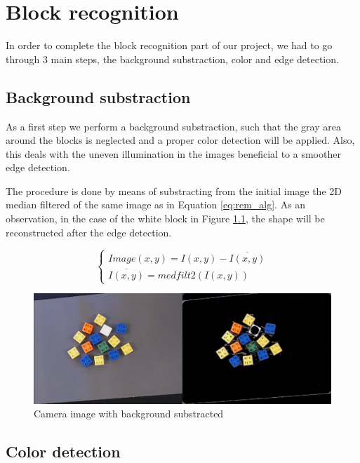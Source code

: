 
\chapter{Block recognition}\label{ch:block_recognition}

In order to complete the block recognition part of our project, we had to go through 3 main steps, the background substraction, color and edge detection.

\section{Background substraction}
As a first step we perform a background substraction, such that the gray area around the blocks is neglected and a proper color detection will be applied. Also, this deals with the uneven illumination in the images beneficial to a smoother edge detection. 

\noindent 
The procedure is done by means of substracting from the initial image the 2D median filtered of the same image as in Equation \ref{eq:rem_alg}. As an observation, in the case of the white block in Figure \ref{fig:rem_back}, the shape will be reconstructed after the edge detection. 

\begin{equation}\label{eq:rem_alg}
  \begin{cases}
    Image(x,y) = I(x,y) - \overline{I(x,y)} \\
    \overline{I(x,y)} = medfilt2(I(x,y))
  \end{cases}
\end{equation}

\begin{figure}[hb]
  \centering
  \includegraphics[scale=0.5]{figures/remove_background.png}
  \caption{Camera image with background substracted}
  \label{fig:rem_back}
\end{figure}

\section{Color detection}

